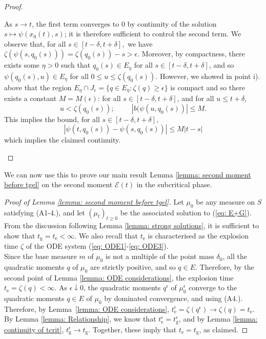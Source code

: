 \begin{proof}
\begin{enumerate}[label=\roman{*}).]
\begin{equation}
\end{equation} As $s\rightarrow t$, the first term converges to $0$ by continuity of the solution $s\mapsto \psi(x_0(t),s)$; it is therefore sufficient to control the second term. We observe that, for all $s\in[t-\delta, t+\delta],$ we have $\zeta(\psi(s,q_0(s)))=\zeta(q_0(s))-s>\epsilon$. Moreover, by compactness, there exists some $\eta>0$ such that $q_0(s) \in E_\eta$ for all $s\in [t-\delta, t+\delta]$, and so $\psi(q_0(s),u)\in E_\eta$ for all $0\le u\le \zeta(q_0(s)).$ However, we showed in point i). above that the region $E_\eta \cap J_\epsilon=\{q \in E_\eta: \zeta(q)\geq\epsilon\}$ is compact  and so there exists a constant $M=M(\epsilon)$: for all $s\in[t-\delta, t+\delta]$, and for all $u \le t+\delta$, \begin{equation}u< \zeta(q_0(s));\hspace{1cm} |b(\psi(u,q_0(s))| \le M. \end{equation}
This implies the bound, for all $s\in[t-\delta,t+\delta]$, \begin{equation} |\psi(t,q_0(s))-\psi(s,q_0(s))| \le M|t-s|\end{equation} which implies the claimed continuity.
\end{enumerate}  \end{proof}



We can now use this to prove our main result Lemma \ref{lemma: second moment before tgel} on the second moment $\mathcal{E}(t)$ in the subcritical phase.





\begin{proof}[Proof of Lemma \ref{lemma: second moment before tgel}]
Let $\mu_0$ be any measure on $S$ satisfying ({A1}-{4}.), and let $(\mu_t)_{t\ge 0}$ be the associated solution to (\ref{eq: E+G}). From the discussion following Lemma \ref{lemma: strong solutions}, it is sufficient to show that $t_\mathrm{g}=t_\mathrm{e}<\infty$. We also recall that $t_\mathrm{e}$ is characterised as the explosion time $\zeta$ of the ODE system (\ref{eq: ODE1}-\ref{eq: ODE3}). \medskip \\ Since the base measure $m$ of $\mu_0$ is not a multiple of the point mass $\delta_0$, all the quadratic moments $q$ of $\mu_0$ are strictly positive, and so $q \in E$. Therefore, by the second point of Lemma \ref{lemma: ODE considerations}, the explosion time $t_\mathrm{e}=\zeta(q)<\infty.$
As $\epsilon \downarrow 0$, the quadratic moments $q^\epsilon$ of $\mu^\epsilon_0$ converge to the quadratic moments $q\in E$ of $\mu_0$ by dominated convergence, and using (A4.).  Therefore, by Lemma~\ref{lemma: ODE considerations},  $t^\epsilon_\mathrm{e}=\zeta(q^\epsilon)\rightarrow \zeta(q)= t_\mathrm{e}$.
By Lemma \ref{lemma: Relationship}, we know that $t_\mathrm{e}^\epsilon=t_\mathrm{g}^\epsilon$, and by Lemma \ref{lemma: continuity of tcrit}, $t_\mathrm{g}^\epsilon \rightarrow t_\mathrm{g}$. Together, these imply that $t_\mathrm{e} = t_\mathrm{g}$, as claimed.

\end{proof} 

